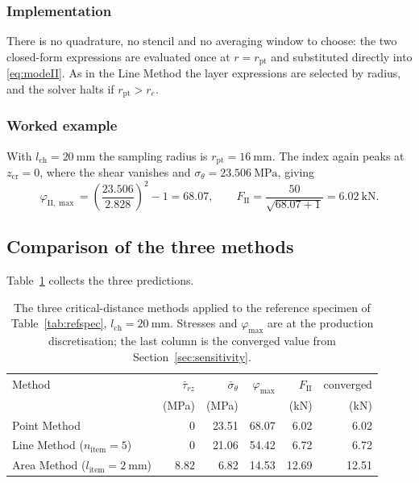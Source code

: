 \subsubsection*{Implementation}
 
There is no quadrature, no stencil and no averaging window to choose: the two
closed-form expressions are evaluated once at $r = r_{\mathrm{pt}}$ and
substituted directly into \eqref{eq:modeII}. As in the Line Method the
layer expressions are selected by radius, and the solver halts if
$r_{\mathrm{pt}} > r_e$.
 
\subsubsection*{Worked example}
 
With $l_{\mathrm{ch}} = \SI{20}{\milli\metre}$ the sampling radius is
$r_{\mathrm{pt}} = \SI{16}{\milli\metre}$. The index again peaks at
$z_{\mathrm{cr}} = 0$, where the shear vanishes and
$\sigma_\theta = \SI{23.506}{\mega\pascal}$, giving
\begin{equation*}
\varphi_{\mathrm{II},\max} = \left(\frac{23.506}{2.828}\right)^{2} - 1 = 68.07,
\qquad
F_{\mathrm{II}} = \frac{50}{\sqrt{68.07 + 1}} = \SI{6.02}{\kilo\newton}.
\end{equation*}

\subsection{Comparison of the three methods}
\label{sec:methodcompare}
 
Table~\ref{tab:threecompare} collects the three predictions.
 
\begin{table}[htbp]
\centering
\caption{The three critical-distance methods applied to the reference
         specimen of Table~\ref{tab:refspec}, $l_{\mathrm{ch}} =
         \SI{20}{\milli\metre}$. Stresses and $\varphi_{\max}$ are at the
         production discretisation; the last column is the converged value
         from Section~\ref{sec:sensitivity}.}
\label{tab:threecompare}
\begin{tabular}{lrrrrr}
\toprule
Method & $\bar{\tau}_{rz}$ & $\bar{\sigma}_\theta$ & $\varphi_{\max}$
       & $F_{\mathrm{II}}$ & converged \\
       & (\si{\mega\pascal}) & (\si{\mega\pascal}) & &
       (\si{\kilo\newton}) & (\si{\kilo\newton}) \\
\midrule
Point Method                                       &  0    & 23.51 & 68.07 &  6.02 &  6.02 \\
Line Method ($n_{\mathrm{item}} = 5$)              &  0    & 21.06 & 54.42 &  6.72 &  6.72 \\
Area Method ($l_{\mathrm{item}} = \SI{2}{\milli\metre}$) &  8.82 &  6.82 & 14.53 & 12.69 & 12.51 \\
\bottomrule
\end{tabular}
\end{table}
 
